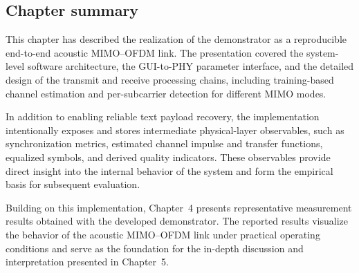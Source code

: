 \subsection{Chapter summary}
\label{sec:method_summary}

This chapter has described the realization of the demonstrator as a reproducible end-to-end acoustic MIMO--OFDM link. The presentation covered the system-level software architecture, the GUI-to-PHY parameter interface, and the detailed design of the transmit and receive processing chains, including training-based channel estimation and per-subcarrier detection for different MIMO modes.

In addition to enabling reliable text payload recovery, the implementation intentionally exposes and stores intermediate physical-layer observables, such as synchronization metrics, estimated channel impulse and transfer functions, equalized symbols, and derived quality indicators. These observables provide direct insight into the internal behavior of the system and form the empirical basis for subsequent evaluation.

Building on this implementation, Chapter~4 presents representative measurement results obtained with the developed demonstrator. The reported results visualize the behavior of the acoustic MIMO--OFDM link under practical operating conditions and serve as the foundation for the in-depth discussion and interpretation presented in Chapter~5.

